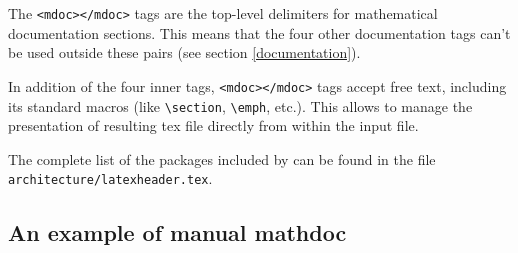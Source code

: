 The \lstinline!<mdoc></mdoc>! tags are the top-level delimiters for \faust mathematical documentation sections. This means that the four other documentation tags can't be used outside these pairs (see section \ref{documentation}).

In addition of the four inner tags, \lstinline!<mdoc></mdoc>! tags accept free \latex text, including its standard macros (like \lstinline!\section!, \lstinline!\emph!, etc.). This allows to manage the presentation of resulting tex file directly from within the input \faust file. 

The complete list of the \latex packages included by \faust can be found in the file \lstinline!architecture/latexheader.tex!.

\subsection{An example of manual mathdoc}
\label{ex-mathdoc}

